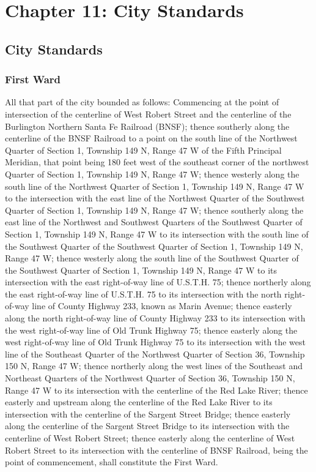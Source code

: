 %
\chapter*{Chapter 11: \newline
	City Standards}


\section{City Standards}
\subsection{First Ward}
All that part of the city bounded as follows:  Commencing at the point of intersection of the centerline of West Robert Street and the centerline of the Burlington Northern Santa Fe Railroad (BNSF); thence southerly along the centerline of the BNSF Railroad to a point on the south line of the Northwest Quarter of Section 1, Township 149 N, Range 47 W of the Fifth Principal Meridian, that point being 180 feet west of the southeast corner of the northwest Quarter of Section 1, Township 149 N, Range 47 W; thence westerly along the south line of the Northwest Quarter of Section 1, Township 149 N, Range 47 W to the intersection with the east line of the Northwest Quarter of the Southwest Quarter of Section 1, Township 149 N, Range 47 W; thence southerly along the east line of the Northwest and Southwest Quarters of the Southwest Quarter of Section 1, Township 149 N, Range 47 W to its intersection with the south line of the Southwest Quarter of the Southwest Quarter of Section 1, Township 149 N, Range 47 W; thence westerly along the south line of the Southwest Quarter of the Southwest Quarter of Section 1, Township 149 N, Range 47 W to its intersection with the east right-of-way line of U.S.T.H. 75; thence northerly along the east right-of-way line of U.S.T.H. 75 to its intersection with the north right-of-way line of County Highway 233, known as Marin Avenue; thence easterly along the north right-of-way line of County Highway 233 to its intersection with the west right-of-way line of Old Trunk Highway 75; thence easterly along the west right-of-way line of Old Trunk Highway 75 to its intersection with the west line of the Southeast Quarter of the Northwest Quarter of Section 36, Township 150 N, Range 47 W; thence northerly along the west lines of the Southeast and Northeast Quarters of the Northwest Quarter of Section 36, Township 150 N, Range 47 W to its intersection with the centerline of the Red Lake River; thence easterly and upstream along the centerline of the Red Lake River to its intersection with the centerline of the Sargent Street Bridge; thence easterly along the centerline of the Sargent Street Bridge to its intersection with the centerline of West Robert Street; thence easterly along the centerline of West Robert Street to its intersection with the centerline of BNSF Railroad, being the point of commencement, shall constitute the First Ward.

